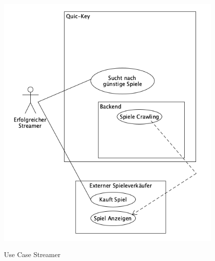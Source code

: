 \begin{figure}[hbt]
    \centering
    \begin{minipage}[t]{1\textwidth} %
        \caption{Use Case Streamer} %
        \includegraphics[width=1\textwidth]{img/use_case_streamer.png}\\ %
    \end{minipage}
\end{figure}